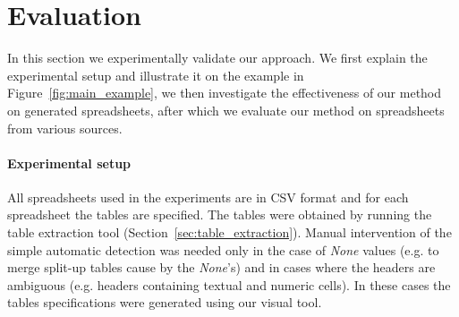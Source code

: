 


\newcommand{\runtotal}{16.12}
\newcommand{\runtotalstd}{0.62}

\newcommand{\runfile}{0.50}
\newcommand{\runfilestd}{0.02}

\newcommand{\benchsize}{??}

\section{Evaluation}\label{sec:evaluation}
In this section we experimentally validate our approach.
We first explain the experimental setup and illustrate it on the example in Figure~\ref{fig:main_example}, we then investigate the effectiveness of our method on generated spreadsheets, after which we evaluate our method on spreadsheets from various sources.

\paragraph{Experimental setup}
\label{sec:evalualtion:method}
All spreadsheets used in the experiments are in CSV format and for each spreadsheet the tables are specified.
The tables were obtained by running the table extraction tool (Section~\ref{sec:table_extraction}).
Manual intervention of the simple automatic detection was needed only in the case of \textit{None} values (e.g. to merge split-up tables cause by the \textit{None}'s) and in cases where the headers are ambiguous (e.g. headers containing textual and numeric cells).
In these cases the tables specifications were generated using our visual tool.

